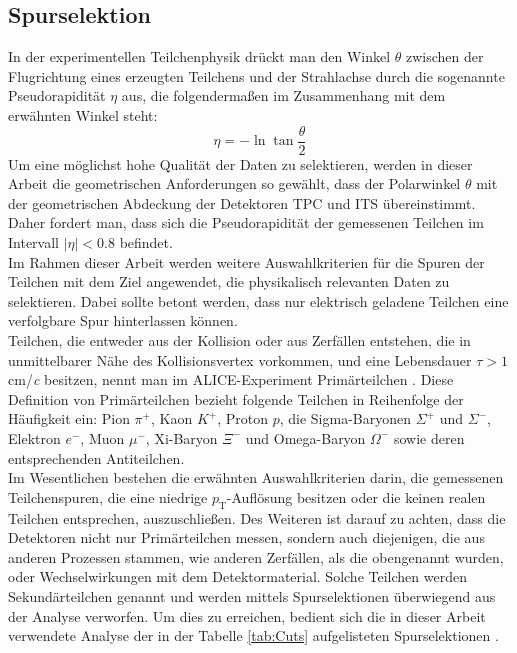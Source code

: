 \documentclass[12pt,a4paper]{report}
\begin{document}
\subsection{Spurselektion}
\label{sec:Spurselektion}
In der experimentellen Teilchenphysik drückt man den Winkel $\theta$ zwischen der Flugrichtung eines erzeugten Teilchens und der Strahlachse durch die sogenannte Pseudorapidität $\eta$ aus, die folgendermaßen im Zusammenhang mit dem erwähnten Winkel steht:
\begin{equation}
 \eta = -\ln{\tan{\dfrac{\theta}{2}}}
\end{equation}
Um eine möglichst hohe Qualität der Daten zu selektieren, werden in dieser Arbeit die geometrischen Anforderungen so gewählt, dass der Polarwinkel $\theta$ mit der geometrischen Abdeckung der Detektoren TPC und ITS übereinstimmt. Daher fordert man, dass sich die Pseudorapidität der gemessenen Teilchen im Intervall $|\eta| < 0.8$ befindet.\\
Im Rahmen dieser Arbeit werden weitere Auswahlkriterien für die Spuren der Teilchen mit dem Ziel angewendet, die physikalisch relevanten Daten zu selektieren. Dabei sollte betont werden, dass nur elektrisch geladene Teilchen eine verfolgbare Spur hinterlassen können.\\
Teilchen, die entweder aus der Kollision oder aus Zerfällen entstehen, die in unmittelbarer Nähe des Kollisionsvertex vorkommen, und eine Lebensdauer \hspace{2cm} $\tau > 1$ cm/\textit{c} besitzen, nennt man im ALICE-Experiment Primärteilchen \cite{ALICE-PUBLIC-2017-005}. Diese Definition von Primärteilchen bezieht folgende Teilchen in Reihenfolge der Häufigkeit ein: Pion $\pi^+$, Kaon $K^+$, Proton $p$, die Sigma-Baryonen $\Sigma^+$ und $\Sigma^-$, Elektron $e^-$, Muon $\mu^-$, Xi-Baryon $\Xi^-$ und Omega-Baryon $\Omega^-$ sowie deren entsprechenden Antiteilchen.\\ 
Im Wesentlichen bestehen die erwähnten Auswahlkriterien darin, die gemessenen Teilchenspuren, die eine niedrige $p_{\mathrm{T}}$-Auflösung besitzen oder die keinen realen Teilchen entsprechen, auszuschließen. Des Weiteren ist darauf zu achten, dass die Detektoren nicht nur Primärteilchen messen, sondern auch diejenigen, die aus anderen Prozessen stammen, wie anderen Zerfällen, als die obengenannt wurden, oder Wechselwirkungen mit dem Detektormaterial. Solche Teilchen werden Sekundärteilchen genannt und werden mittels Spurselektionen überwiegend aus der Analyse verworfen. Um dies zu erreichen, bedient sich die in dieser Arbeit verwendete Analyse der in der Tabelle \ref{tab:Cuts} aufgelisteten Spurselektionen \cite{eperezlezama2018}.\\
\end{document}
